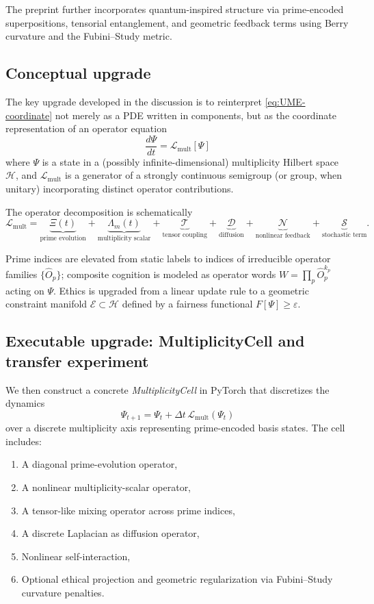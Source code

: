 \documentclass[11pt]{article}
\begin{document}
The preprint further incorporates quantum-inspired structure via prime-encoded superpositions, tensorial entanglement, and geometric feedback terms using Berry curvature and the Fubini--Study metric.

\subsection{Conceptual upgrade}

The key upgrade developed in the discussion is to reinterpret \eqref{eq:UME-coordinate} not merely as a PDE written in components, but as the coordinate representation of an operator equation
\begin{equation}
\boxed{
\frac{d\Psi}{dt} = \mathcal{L}_{\mathrm{mult}}[\Psi]
}
\end{equation}
where $\Psi$ is a state in a (possibly infinite-dimensional) multiplicity Hilbert space $\mathcal{H}$, and $\mathcal{L}_{\mathrm{mult}}$ is a generator of a strongly continuous semigroup (or group, when unitary) incorporating distinct operator contributions.

The operator decomposition is schematically
\begin{equation}
\mathcal{L}_{\mathrm{mult}}
=
\underbrace{\Xi(t)}_{\text{prime evolution}}
+
\underbrace{\Lambda_m(t)}_{\text{multiplicity scalar}}
+
\underbrace{\mathcal{T}}_{\text{tensor coupling}}
+
\underbrace{\mathcal{D}}_{\text{diffusion}}
+
\underbrace{\mathcal{N}}_{\text{nonlinear feedback}}
+
\underbrace{\mathcal{S}}_{\text{stochastic term}}.
\end{equation}

Prime indices are elevated from static labels to indices of irreducible operator families $\{\hat{O}_p\}$; composite cognition is modeled as operator words $W = \prod_p \hat{O}_p^{k_p}$ acting on $\Psi$. Ethics is upgraded from a linear update rule to a geometric constraint manifold $\mathcal{E}\subset\mathcal{H}$ defined by a fairness functional $F[\Psi]\ge \varepsilon$.

\subsection{Executable upgrade: MultiplicityCell and transfer experiment}

We then construct a concrete \emph{MultiplicityCell} in PyTorch that discretizes the dynamics
\[
\Psi_{t+1} = \Psi_t + \Delta t\,\mathcal{L}_{\mathrm{mult}}(\Psi_t)
\]
over a discrete multiplicity axis representing prime-encoded basis states. The cell includes:
\begin{enumerate}[nosep]
\item A diagonal prime-evolution operator,
\item A nonlinear multiplicity-scalar operator,
\item A tensor-like mixing operator across prime indices,
\item A discrete Laplacian as diffusion operator,
\item Nonlinear self-interaction,
\item Optional ethical projection and geometric regularization via Fubini--Study curvature penalties.
\end{enumerate}
\end{document}
